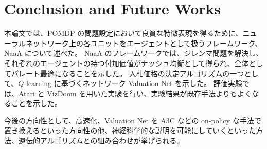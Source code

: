 \section{Conclusion and Future Works}
本論文では、POMDP の問題設定において良質な特徴表現を得るために、ニューラルネットワーク上の各ユニットをエージェントとして扱うフレームワーク、NaaA について述べた。
NaaA のフレームワークでは、ジレンマ問題を解決し、それぞれのエージェントの持つ付加価値がナッシュ均衡として得られ、全体としてパレート最適になることを示した。
入札価格の決定アルゴリズムの一つとして、$Q$-learning に基づくネットワーク Valuation Net を示した。
評価実験では、Atari と VizDoom を用いた実験を行い、実験結果が既存手法よりもよくなることを示した。

今後の方向性として、高速化、Valuation Net を A3C などの on-policy な手法で置き換えるといった方向性の他、神経科学的な説明を可能にしていくといった方法、遺伝的アルゴリズムとの組み合わせが挙げられる。
